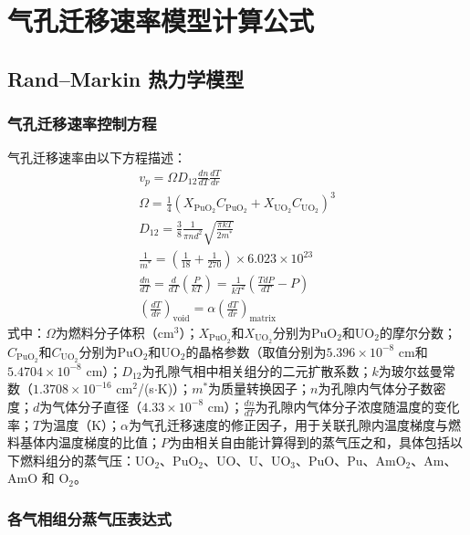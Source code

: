 \chapter{气孔迁移速率模型计算公式}
\label{app:pore_migration_models}

\section{Rand--Markin 热力学模型}

\subsection{气孔迁移速率控制方程}

气孔迁移速率由以下方程描述：
\begin{equation}
	\begin{gathered}
		v_p = \Omega D_{12} \frac{dn}{dT} \frac{dT}{dr} \\
		\Omega = \frac{1}{4} (X_{\text{PuO}_2} C_{\text{PuO}_2} + X_{\text{UO}_2} C_{\text{UO}_2})^3 \\
		D_{12} = \frac{3}{8} \frac{1}{\pi nd^2} \sqrt{\frac{\pi kT}{2m^*}} \\
		\frac{1}{m^*} = \left( \frac{1}{18} + \frac{1}{270} \right) \times 6.023 \times 10^{23} \\
		\frac{dn}{dT} = \frac{d}{dT} (\frac{P}{kT}) = \frac{1}{kT^2} \left( \frac{TdP}{dT} - P \right) \\
		\left( \frac{dT}{dr} \right)_{\text{void}} = \alpha \left( \frac{dT}{dr} \right)_{\text{matrix}}
	\end{gathered}
	\label{eq:app_b_rand_markin_migration_control}
\end{equation}
\noindent 式中：$\Omega$为燃料分子体积（cm$^3$）；$X_{\text{PuO}_2}$和$X_{\text{UO}_2}$分别为PuO$_2$和UO$_2$的摩尔分数；$C_{\text{PuO}_2}$和$C_{\text{UO}_2}$分别为PuO$_2$和UO$_2$的晶格参数（取值分别为$5.396 \times 10^{-8}$ cm和$5.4704 \times 10^{-8}$ cm）；$D_{12}$为孔隙气相中相关组分的二元扩散系数；$k$为玻尔兹曼常数（$1.3708 \times 10^{-16}$ cm$^2$/(s$\cdot$K)）；$m^*$为质量转换因子；$n$为孔隙内气体分子数密度；$d$为气体分子直径（$4.33 \times 10^{-8}$ cm）；$\frac{dn}{dT}$为孔隙内气体分子浓度随温度的变化率；$T$为温度（K）；$\alpha$为气孔迁移速度的修正因子，用于关联孔隙内温度梯度与燃料基体内温度梯度的比值；$P$为由相关自由能计算得到的蒸气压之和，具体包括以下燃料组分的蒸气压：UO$_2$、PuO$_2$、UO、U、UO$_3$、PuO、Pu、AmO$_2$、Am、AmO 和 O$_2$。

\subsection{各气相组分蒸气压表达式}

